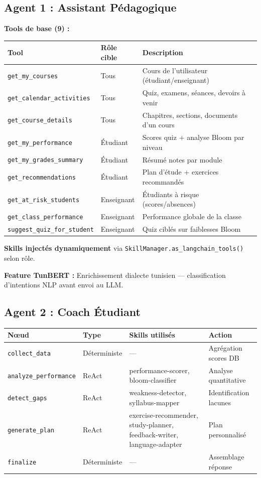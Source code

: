\documentclass[12pt,a4paper]{article}
\begin{document}
\subsection{Agent 1 : Assistant Pédagogique}

\textbf{Tools de base (9) :}

\begin{longtable}{lll}
\toprule
\textbf{Tool} & \textbf{Rôle cible} & \textbf{Description} \\
\midrule
\texttt{get\_my\_courses} & Tous & Cours de l'utilisateur (étudiant/enseignant) \\
\texttt{get\_calendar\_activities} & Tous & Quiz, examens, séances, devoirs à venir \\
\texttt{get\_course\_details} & Tous & Chapitres, sections, documents d'un cours \\
\texttt{get\_my\_performance} & Étudiant & Scores quiz + analyse Bloom par niveau \\
\texttt{get\_my\_grades\_summary} & Étudiant & Résumé notes par module \\
\texttt{get\_recommendations} & Étudiant & Plan d'étude + exercices recommandés \\
\texttt{get\_at\_risk\_students} & Enseignant & Étudiants à risque (scores/absences) \\
\texttt{get\_class\_performance} & Enseignant & Performance globale de la classe \\
\texttt{suggest\_quiz\_for\_student} & Enseignant & Quiz ciblés sur faiblesses Bloom \\
\bottomrule
\end{longtable}

\textbf{Skills injectés dynamiquement} via \texttt{SkillManager.as\_langchain\_tools()} selon rôle.

\textbf{Feature TunBERT :} Enrichissement dialecte tunisien --- classification d'intentions NLP avant envoi au LLM.

\subsection{Agent 2 : Coach Étudiant}

\begin{longtable}{llll}
\toprule
\textbf{Nœud} & \textbf{Type} & \textbf{Skills utilisés} & \textbf{Action} \\
\midrule
\texttt{collect\_data} & Déterministe & --- & Agrégation scores DB \\
\texttt{analyze\_performance} & ReAct & performance-scorer, bloom-classifier & Analyse quantitative \\
\texttt{detect\_gaps} & ReAct & weakness-detector, syllabus-mapper & Identification lacunes \\
\texttt{generate\_plan} & ReAct & exercise-recommender, study-planner, feedback-writer, language-adapter & Plan personnalisé \\
\texttt{finalize} & Déterministe & --- & Assemblage réponse \\
\bottomrule
\end{longtable}
\end{document}
